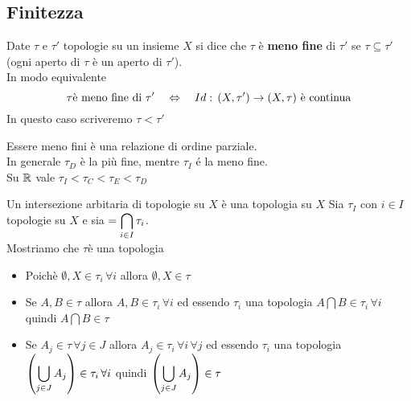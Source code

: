 \subsection{Finitezza}
\begin{defn}
 Date $\tau$ e $\tau'$ topologie su un insieme $X$ si dice che $\tau$ \`e \textbf{meno fine} di $\tau'$ se $\tau\subseteq \tau'$ (ogni aperto di $\tau$ \`e un aperto di $\tau'$).\\
 In modo equivalente 
 $$ \tau \text{\`e meno fine di } \tau' \quad \Leftrightarrow \quad Id:\, (X,\tau') \to (X,\tau) \text{ \`e continua}$$
 In questo caso scriveremo $\tau < \tau'$
\end{defn}
\begin{oss}
Essere meno fini \`e una relazione di ordine parziale.\\
In generale $\tau_D$ \`e la pi\`u fine, mentre $\tau_I$ \'e la meno fine.\\
Su $\mathbb{R}$ vale $ \tau_I < \tau_C < \tau_E < \tau_D $
\end{oss}
\spazio
\begin{lem}
 Un intersezione arbitaria di topologie su $X$ \`e una topologia su $X$ 
 \proof Sia $\tau_I $ con $i \in I $ topologie su $X$ e sia $\displaystyle=\bigcap_{i\in I} \tau_i $.\\
 Mostriamo che $\tau$\`e una topologia
 \begin{itemize}
  \item Poich\`e $\emptyset, X \in \tau_i \, \forall i $ allora $\emptyset, X \in \tau $
  \item Se $A,B\in\tau $ allora  $A, B \in \tau_i \, \forall i $ ed essendo $\tau_i$ una topologia $A\bigcap B \in \tau_i \, \forall i $ quindi $A\bigcap B\in \tau$
  \item Se $A_j \in \tau  \, \forall j \in J $ allora $A_j \in \tau_i \, \forall i \, \forall j $ ed essendo $\tau_i$ una topologia $\displaystyle \left( \bigcup_{j\in J} A_j\right) \in \tau_i \, \forall i $ quindi  $\displaystyle \left( \bigcup_{j\in J} A_j\right) \in \tau$
 \end{itemize}
\endproof
\end{lem}

